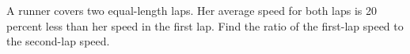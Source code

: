 A runner covers two equal-length laps. Her average speed for both laps is 20 percent less than her speed in the first lap. Find the ratio of the first-lap speed to the second-lap speed.
